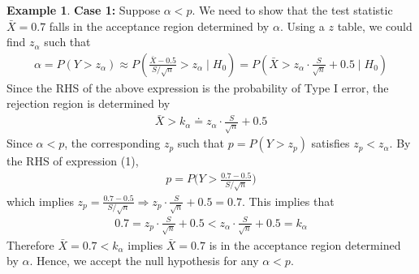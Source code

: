 \documentclass[11pt,letterpaper]{article}
\numberwithin{theorem}{section}
\numberwithin{definition}{section}
\numberwithin{lemma}{section}
\numberwithin{corollary}{section}
\numberwithin{proposition}{section}
\theoremstyle{definition}
\numberwithin{remark}{section}
\numberwithin{claim}{section}
\numberwithin{observation}{section}
\numberwithin{fact}{section}
\numberwithin{assumption}{section}
\newtheorem{example}[theorem]{Example}
\numberwithin{example}{section}
\numberwithin{exercise}{section}
\begin{document}
\begin{example}
\textbf{Case 1:} Suppose $\alpha < p$. We need to show that the test statistic $\bar{X} = 0.7$ falls in the acceptance region determined by $\alpha$. Using a $z$ table, we could find $z_{\alpha}$ such that
\begin{align*}
\alpha = P(Y > z_{\alpha}) \approx P(\frac{\bar{X}-0.5}{S/\sqrt{n}} > z_{\alpha} \mid H_0) = P(\bar{X} > z_{\alpha} \cdot \frac{S}{\sqrt{n}} + 0.5 \mid H_0)
\end{align*}
Since the RHS of the above expression is the probability of Type I error, the rejection region is determined by
\begin{align*}
\bar{X} > k_{\alpha} \doteq z_{\alpha} \cdot \frac{S}{\sqrt{n}} + 0.5
\end{align*}
Since $\alpha < p$, the corresponding $z_{p}$ such that $p = P(Y > z_p)$ satisfies $z_p < z_{\alpha}$. By the RHS of expression (1),
\begin{align*}
p = P\Big(Y > \frac{0.7 - 0.5}{S/\sqrt{n}} \Big)
\end{align*}
which implies $z_p = \frac{0.7 - 0.5}{S/\sqrt{n}} \Rightarrow  z_p \cdot \frac{S}{\sqrt{n}} + 0.5 = 0.7$. This implies that
\begin{align*}
0.7 = z_p \cdot \frac{S}{\sqrt{n}} + 0.5 <  z_{\alpha} \cdot \frac{S}{\sqrt{n}} + 0.5 = k_{\alpha}
\end{align*}
Therefore $\bar{X} = 0.7 < k_{\alpha}$ implies $\bar{X} = 0.7$ is in the acceptance region determined by $\alpha$. Hence, we accept the null hypothesis for any $\alpha < p$.


\end{example}
\end{document}
